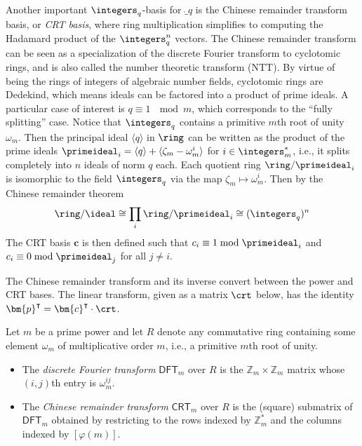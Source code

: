 Another important $\integers_q$-basis for $\ring_q$ is the Chinese remainder transform basis, or \emph{CRT basis}, where ring multiplication simplifies to computing the Hadamard product of the $\integers_{q}^n$ vectors. The Chinese remainder transform can be seen as a specialization of the discrete Fourier transform to cyclotomic rings, and is also called the number theoretic transform (NTT). By virtue of being the rings of integers of algebraic number fields, cyclotomic rings are Dedekind, which means ideals can be factored into a product of prime ideals. A particular case of interest is $q \equiv 1\ \mod m$, which corresponds to the ``fully splitting'' case. Notice that $\integers_q$ contains a primitive $m$th root of unity $\omega_m$. Then the principal ideal $\langle q \rangle$ in $\ring$ can be written as the product of the prime ideals $\primeideal_{i} = \langle q \rangle + \langle \zeta_m - \omega_{m}^i \rangle$ for $i \in \integers_{m}^{*}$, i.e., it splits completely into $n$ ideals of norm $q$ each. Each quotient ring $\ring/\primeideal_{i}$ is isomorphic to the field $\integers_q$ via the map $\zeta_m \mapsto \omega_{m}^i$. Then by the Chinese remainder theorem
\[
\ring/\ideal \cong \prod_i \ring/\primeideal_{i} \cong (\integers_{q})^n
\]
The CRT basis $\bm{c}$ is then defined such that $c_i \equiv 1 \bmod \primeideal_{i}$ and $c_i \equiv 0 \bmod \primeideal_j$ for all $j \neq i$.

The Chinese remainder transform and its inverse convert between the power and CRT bases. The linear transform, given as a matrix $\crt$ below, has the identity $\bm{p}^\intercal = \bm{c}^\intercal \cdot \crt$.

\begin{definition}
  \label{def:crt}
Let $m$ be a prime power and let $R$ denote any commutative ring containing some element $\omega_m$ of multiplicative order $m$, i.e., a primitive $m$th root of unity.
\begin{itemize}[nosep]
  \item The \emph{discrete Fourier transform} $\mathsf{DFT}_m$ over $R$ is the $\mathbb{Z}_m \times \mathbb{Z}_m$ matrix whose $(i,j)$th entry is $\omega_m^{ij}$.
  \item The \emph{Chinese remainder transform} $\mathsf{CRT}_m$ over $R$ is the (square) submatrix of $\mathsf{DFT}_m$ obtained by restricting to the rows indexed by $\mathbb{Z}_m^*$ and the columns indexed by $[\varphi(m)]$.
\end{itemize}
\end{definition}

